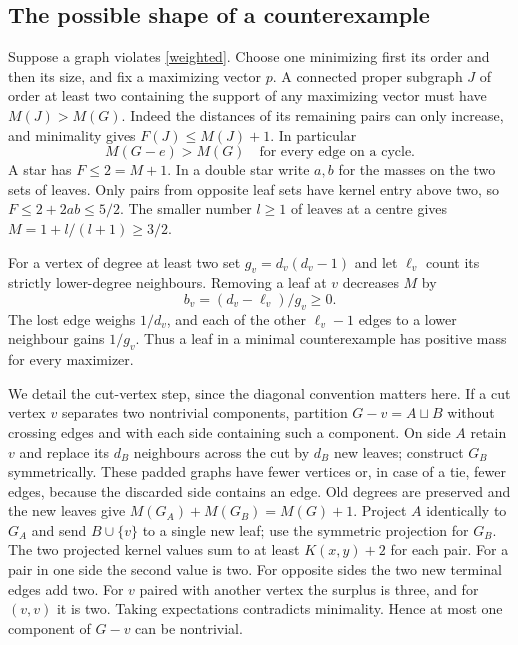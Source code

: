 \documentclass[11pt,a4paper]{article}
\theoremstyle{remark}\newtheorem*{remark}{Remark}
\begin{document}
\subsection{The possible shape of a counterexample}
Suppose a graph violates \eqref{weighted}. Choose one minimizing first its order and then its size, and fix a maximizing vector $p$. A connected proper subgraph $J$ of order at least two containing the support of any maximizing vector must have $M(J)>M(G)$. Indeed the distances of its remaining pairs can only increase, and minimality gives $F(J)\le M(J)+1$. In particular
\begin{equation}
 M(G-e)>M(G)\quad\text{for every edge on a cycle.}\label{supportive}
\end{equation}
A star has $F\le2=M+1$. In a double star write $a,b$ for the masses on the two sets of leaves. Only pairs from opposite leaf sets have kernel entry above two, so $F\le2+2ab\le5/2$. The smaller number $l\ge1$ of leaves at a centre gives $M=1+l/(l+1)\ge3/2$.

For a vertex of degree at least two set $g_v=d_v(d_v-1)$ and let $\ell_v$ count its strictly lower-degree neighbours. Removing a leaf at $v$ decreases $M$ by
\begin{equation}
 b_v=(d_v-\ell_v)/g_v\ge0.\label{bleaf}
\end{equation}
The lost edge weighs $1/d_v$, and each of the other $\ell_v-1$ edges to a lower neighbour gains $1/g_v$. Thus a leaf in a minimal counterexample has positive mass for every maximizer.

We detail the cut-vertex step, since the diagonal convention matters here. If a cut vertex $v$ separates two nontrivial components, partition $G-v=A\sqcup B$ without crossing edges and with each side containing such a component. On side $A$ retain $v$ and replace its $d_B$ neighbours across the cut by $d_B$ new leaves; construct $G_B$ symmetrically. These padded graphs have fewer vertices or, in case of a tie, fewer edges, because the discarded side contains an edge. Old degrees are preserved and the new leaves give $M(G_A)+M(G_B)=M(G)+1$. Project $A$ identically to $G_A$ and send $B\cup\{v\}$ to a single new leaf; use the symmetric projection for $G_B$. The two projected kernel values sum to at least $K(x,y)+2$ for each pair. For a pair in one side the second value is two. For opposite sides the two new terminal edges add two. For $v$ paired with another vertex the surplus is three, and for $(v,v)$ it is two. Taking expectations contradicts minimality. Hence at most one component of $G-v$ can be nontrivial.
\end{document}
